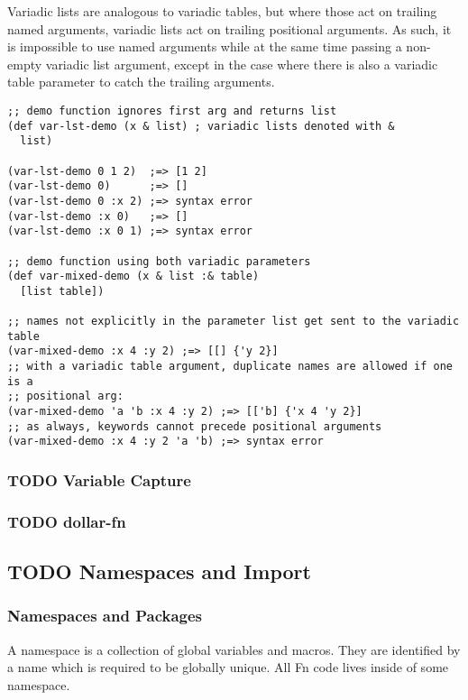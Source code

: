 \documentclass[11pt]{article}
\begin{document}
Variadic lists are analogous to variadic tables, but where those act on trailing
named arguments, variadic lists act on trailing positional arguments. As such,
it is impossible to use named arguments while at the same time passing a
non-empty variadic list argument, except in the case where there is also a
variadic table parameter to catch the trailing arguments.
\begin{verbatim}
;; demo function ignores first arg and returns list
(def var-lst-demo (x & list) ; variadic lists denoted with &
  list)

(var-lst-demo 0 1 2)  ;=> [1 2]
(var-lst-demo 0)      ;=> []
(var-lst-demo 0 :x 2) ;=> syntax error
(var-lst-demo :x 0)   ;=> []
(var-lst-demo :x 0 1) ;=> syntax error

;; demo function using both variadic parameters
(def var-mixed-demo (x & list :& table)
  [list table])

;; names not explicitly in the parameter list get sent to the variadic table
(var-mixed-demo :x 4 :y 2) ;=> [[] {'y 2}]
;; with a variadic table argument, duplicate names are allowed if one is a 
;; positional arg:
(var-mixed-demo 'a 'b :x 4 :y 2) ;=> [['b] {'x 4 'y 2}]
;; as always, keywords cannot precede positional arguments
(var-mixed-demo :x 4 :y 2 'a 'b) ;=> syntax error
\end{verbatim}


\subsubsection{{\bfseries\sffamily TODO} Variable Capture}
\label{sec:org5f73b62}


\subsubsection{{\bfseries\sffamily TODO} dollar-fn}
\label{sec:org8e5416c}


\subsection{{\bfseries\sffamily TODO} Namespaces and Import}
\label{sec:org3eb67b4}

\subsubsection{Namespaces and Packages}
\label{sec:org8fdf53d}

A namespace is a collection of global variables and macros. They are identified
by a name which is required to be globally unique. All Fn code lives inside of
some namespace.
\end{document}
